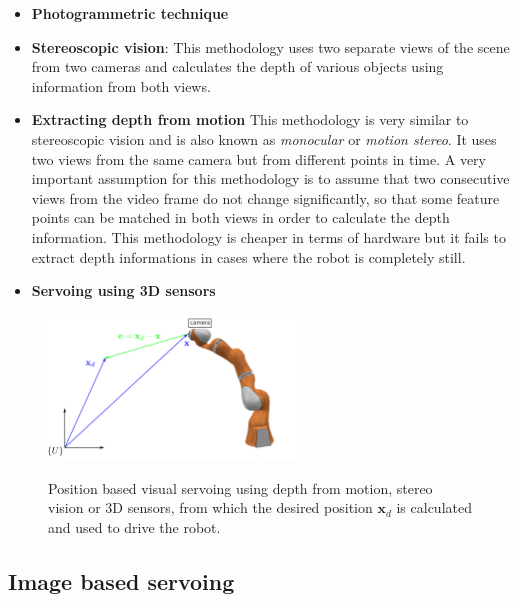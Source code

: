 \begin{itemize}
\item \textbf{Photogrammetric technique}
\item \textbf{Stereoscopic vision}: This methodology uses two separate views of the scene from two cameras and calculates the depth of various objects using information from both views. 

\item \textbf{Extracting depth from motion} This methodology is very similar to stereoscopic vision and is also known as \textit{monocular} or \textit{motion stereo}. It uses two views from the same camera but from different points in time. A very important assumption for this methodology is to assume that two consecutive views from the video frame do not change significantly, so that some feature points can be matched in both views in order to calculate the depth information. This methodology is cheaper in terms of hardware but it fails to extract depth informations in cases where the robot is completely still.
\item \textbf{Servoing using 3D sensors}
\end{itemize}

\begin{center}
\begin{figure}[htbp]
\centering
\includegraphics[width=0.6\textwidth]{images/visual-servoing-position-based2.png}\\
\caption{Position based visual servoing using depth from motion, stereo vision or 3D sensors, from which the desired position $\mathbf{x}_d$ is calculated and used to drive the robot.}
\end{figure}
\end{center}

\subsection{Image based servoing}


